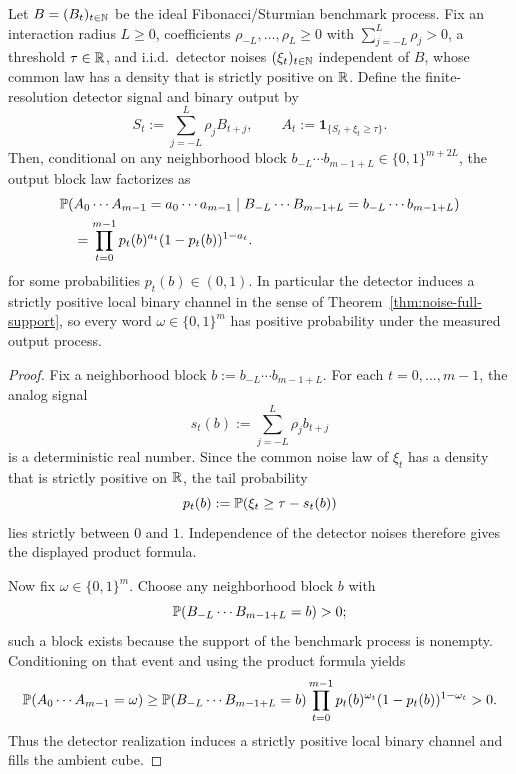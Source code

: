 \begin{proposition}\label{prop:detector-realization}
Let $B=(B_t)_{t\in\mathbb{N}}$ be the ideal Fibonacci/Sturmian benchmark process. Fix an interaction radius $L\ge 0$, coefficients $\rho_{-L},\dots,\rho_L\ge 0$ with $\sum_{j=-L}^L\rho_j>0$, a threshold $\tau\in\mathbb{R}$, and i.i.d.\ detector noises $(\xi_t)_{t\in\mathbb{N}}$ independent of $B$, whose common law has a density that is strictly positive on $\mathbb{R}$. Define the finite-resolution detector signal and binary output by
\[
S_t:=\sum_{j=-L}^L \rho_j B_{t+j},
\qquad
A_t:=\mathbf{1}_{\{S_t+\xi_t\ge \tau\}}.
\]
Then, conditional on any neighborhood block $b_{-L}\cdots b_{m-1+L}\in\{0,1\}^{m+2L}$, the output block law factorizes as
\begin{equation*}
\begin{aligned}
\mathbb{P}(&A_0\cdots A_{m-1}=a_0\cdots a_{m-1}
\mid B_{-L}\cdots B_{m-1+L}=b_{-L}\cdots b_{m-1+L})
\\
&=
\prod_{t=0}^{m-1} p_t(b)^{a_t}(1-p_t(b))^{1-a_t}.
\end{aligned}
\end{equation*}
for some probabilities $p_t(b)\in(0,1)$. In particular the detector induces a strictly positive local binary channel in the sense of Theorem~\ref{thm:noise-full-support}, so every word $\omega\in\{0,1\}^m$ has positive probability under the measured output process.
\end{proposition}

\begin{proof}
Fix a neighborhood block $b:=b_{-L}\cdots b_{m-1+L}$. For each $t=0,\dots,m-1$, the analog signal
\[
s_t(b):=\sum_{j=-L}^L \rho_j b_{t+j}
\]
is a deterministic real number. Since the common noise law of $\xi_t$ has a density that is strictly positive on $\mathbb{R}$, the tail probability
\[
p_t(b):=\mathbb{P}(\xi_t\ge \tau-s_t(b))
\]
lies strictly between $0$ and $1$. Independence of the detector noises therefore gives the displayed product formula.

Now fix $\omega\in\{0,1\}^m$. Choose any neighborhood block $b$ with
\[
\mathbb{P}(B_{-L}\cdots B_{m-1+L}=b)>0;
\]
such a block exists because the support of the benchmark process is nonempty. Conditioning on that event and using the product formula yields
\[
\mathbb{P}(A_0\cdots A_{m-1}=\omega)
\ge
\mathbb{P}(B_{-L}\cdots B_{m-1+L}=b)\prod_{t=0}^{m-1} p_t(b)^{\omega_t}(1-p_t(b))^{1-\omega_t}>0.
\]
Thus the detector realization induces a strictly positive local binary channel and fills the ambient cube.
\end{proof}

